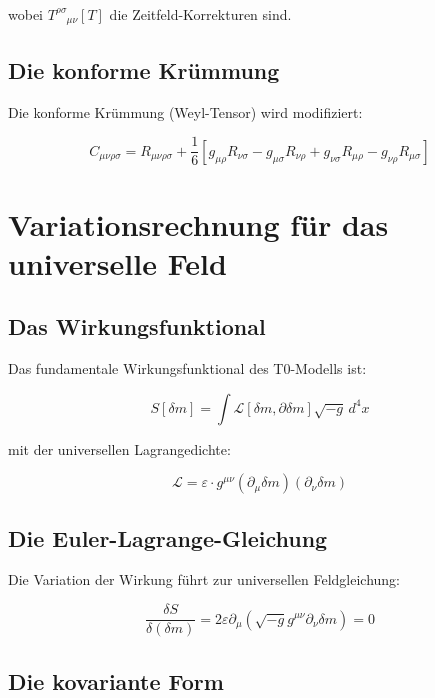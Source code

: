 \documentclass[12pt,a4paper]{report}
\begin{document}
	wobei $T^{\rho\sigma}_{\phantom{\rho\sigma}\mu\nu}[T]$ die Zeitfeld-Korrekturen sind.
	
	\subsection{Die konforme Krümmung}
	
	Die konforme Krümmung (Weyl-Tensor) wird modifiziert:
	
	\begin{equation}
		C_{\mu\nu\rho\sigma} = R_{\mu\nu\rho\sigma} + \frac{1}{6}[g_{\mu\rho}R_{\nu\sigma} - g_{\mu\sigma}R_{\nu\rho} + g_{\nu\sigma}R_{\mu\rho} - g_{\nu\rho}R_{\mu\sigma}]
	\end{equation}
	
	\section{Variationsrechnung für das universelle Feld}
	
	\subsection{Das Wirkungsfunktional}
	
	Das fundamentale Wirkungsfunktional des T0-Modells ist:
	
	\begin{equation}
		S[\delta m] = \int \mathcal{L}[\delta m, \partial\delta m] \sqrt{-g} \, d^4x
	\end{equation}
	
	mit der universellen Lagrangedichte:
	
	\begin{equation}
		\mathcal{L} = \varepsilon \cdot g^{\mu\nu} (\partial_\mu\delta m)(\partial_\nu\delta m)
	\end{equation}
	
	\subsection{Die Euler-Lagrange-Gleichung}
	
	Die Variation der Wirkung führt zur universellen Feldgleichung:
	
	\begin{equation}
		\frac{\delta S}{\delta(\delta m)} = 2\varepsilon \partial_\mu(\sqrt{-g} g^{\mu\nu} \partial_\nu\delta m) = 0
	\end{equation}
	
	\subsection{Die kovariante Form}
	
\end{document}
